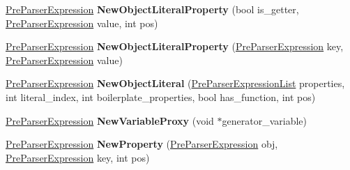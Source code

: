 \begin{DoxyCompactItemize}
\item 
\hypertarget{classv8_1_1internal_1_1_pre_parser_factory_a53d3a9c14751f2b335a44f69cf682cf7}{}\hyperlink{classv8_1_1internal_1_1_pre_parser_expression}{Pre\+Parser\+Expression} {\bfseries New\+Object\+Literal\+Property} (bool is\+\_\+getter, \hyperlink{classv8_1_1internal_1_1_pre_parser_expression}{Pre\+Parser\+Expression} value, int pos)\label{classv8_1_1internal_1_1_pre_parser_factory_a53d3a9c14751f2b335a44f69cf682cf7}

\item 
\hypertarget{classv8_1_1internal_1_1_pre_parser_factory_ae015b55607820e3a934b0123ab0c2d89}{}\hyperlink{classv8_1_1internal_1_1_pre_parser_expression}{Pre\+Parser\+Expression} {\bfseries New\+Object\+Literal\+Property} (\hyperlink{classv8_1_1internal_1_1_pre_parser_expression}{Pre\+Parser\+Expression} key, \hyperlink{classv8_1_1internal_1_1_pre_parser_expression}{Pre\+Parser\+Expression} value)\label{classv8_1_1internal_1_1_pre_parser_factory_ae015b55607820e3a934b0123ab0c2d89}

\item 
\hypertarget{classv8_1_1internal_1_1_pre_parser_factory_ab926369ba8f6c47ba8ff97e937fff1a8}{}\hyperlink{classv8_1_1internal_1_1_pre_parser_expression}{Pre\+Parser\+Expression} {\bfseries New\+Object\+Literal} (\hyperlink{classv8_1_1internal_1_1_pre_parser_expression_list}{Pre\+Parser\+Expression\+List} properties, int literal\+\_\+index, int boilerplate\+\_\+properties, bool has\+\_\+function, int pos)\label{classv8_1_1internal_1_1_pre_parser_factory_ab926369ba8f6c47ba8ff97e937fff1a8}

\item 
\hypertarget{classv8_1_1internal_1_1_pre_parser_factory_a58b175dc3f9efeeac76953c501830e8b}{}\hyperlink{classv8_1_1internal_1_1_pre_parser_expression}{Pre\+Parser\+Expression} {\bfseries New\+Variable\+Proxy} (void $\ast$generator\+\_\+variable)\label{classv8_1_1internal_1_1_pre_parser_factory_a58b175dc3f9efeeac76953c501830e8b}

\item 
\hypertarget{classv8_1_1internal_1_1_pre_parser_factory_a0f1b2ceafa3241d33bbe10cdca095998}{}\hyperlink{classv8_1_1internal_1_1_pre_parser_expression}{Pre\+Parser\+Expression} {\bfseries New\+Property} (\hyperlink{classv8_1_1internal_1_1_pre_parser_expression}{Pre\+Parser\+Expression} obj, \hyperlink{classv8_1_1internal_1_1_pre_parser_expression}{Pre\+Parser\+Expression} key, int pos)\label{classv8_1_1internal_1_1_pre_parser_factory_a0f1b2ceafa3241d33bbe10cdca095998}


\end{DoxyCompactItemize}
